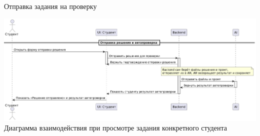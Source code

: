 \documentclass[aspectratio=169]{beamer}
\begin{document}
\begin{frame}{Отправка задания на проверку}
\vspace{0.5em}

\centering
\includegraphics[width=0.75\linewidth]{static/TaskSendStudentDiagram.png} \\
\small Диаграмма взаимодействия при просмотре задания конкретного студента
\end{frame}

%
\end{document}
